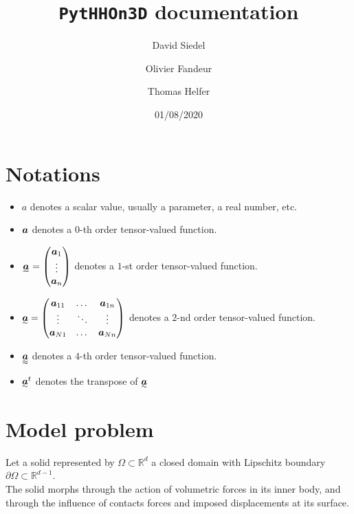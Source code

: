 \documentclass[fleqn]{article}
\title{\texttt{PytHHOn3D} documentation}
\author{David Siedel \and Olivier Fandeur \and  Thomas Helfer}
\date{01/08/2020}
\begin{document}
  \maketitle

  \section{Notations}

    \begin{itemize}
      \item $a$ denotes a scalar value, usually a parameter, a real number, etc.
      \item $\bm{a}$ denotes a $0$-th order tensor-valued function.
      \item $\tensori{a} = \begin{pmatrix}
        \tensoro{a}_1 \\ \vdots \\ \tensoro{a}_n
      \end{pmatrix}$ denotes a $1$-st order tensor-valued function.
      \item $\tensorii{a} = \begin{pmatrix}
        \tensoro{a}_{11} & \dots & \tensoro{a}_{1n} \\ \vdots & \ddots & \vdots \\ \tensoro{a}_{N1} & \dots & \tensoro{a}_{Nn}
      \end{pmatrix}$ denotes a $2$-nd order tensor-valued function.
      \item $\tensoriv{a}$ denotes a $4$-th order tensor-valued function.
      \item $\tensorii{a}^t$ denotes the transpose of $\tensorii{a}$
    \end{itemize}

    \newpage
    
  \section{Model problem}

        Let a solid represented by $\Omega \subset \mathbb{R}^d$ a closed domain with Lipschitz boundary $\partial \Omega \subset \mathbb{R}^{d-1}$.
        \\
        The solid morphs through the action of volumetric forces in its inner body, and through the influence of contacts forces and imposed displacements at its surface.
        \par
\end{document}
